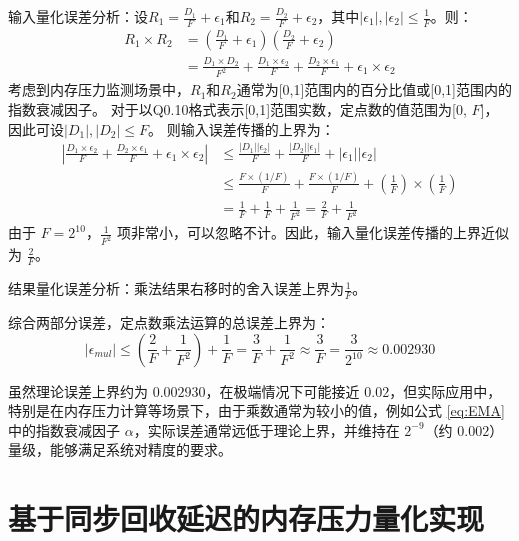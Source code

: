 输入量化误差分析：设$R_1 = \frac{D_1}{F} + \epsilon_1$和$R_2 = \frac{D_2}{F} + \epsilon_2$，其中$|\epsilon_1|, |\epsilon_2| \leq \frac{1}{F}$。则：
\[
\begin{aligned}
R_1 \times R_2 &= (\frac{D_1}{F} + \epsilon_1)(\frac{D_2}{F} + \epsilon_2) \\
&= \frac{D_1 \times D_2}{F^2} + \frac{D_1 \times \epsilon_2}{F} + \frac{D_2 \times \epsilon_1}{F} + \epsilon_1 \times \epsilon_2
\end{aligned}
\]
考虑到内存压力监测场景中，$R_1$和$R_2$通常为[0,1]范围内的百分比值或[0,1]范围内的指数衰减因子。 对于以Q0.10格式表示[0,1]范围实数，定点数的值范围为[0, $F$]，因此可设$|D_1|, |D_2| \leq F$。 则输入误差传播的上界为：
\begin{equation}
\begin{aligned}
|\frac{D_1 \times \epsilon_2}{F} + \frac{D_2 \times \epsilon_1}{F} + \epsilon_1 \times \epsilon_2| &\leq \frac{|D_1| |\epsilon_2|}{F} + \frac{|D_2| |\epsilon_1|}{F} + |\epsilon_1| |\epsilon_2| \\
&\leq \frac{F \times (1/F)}{F} + \frac{F \times (1/F)}{F} + (\frac{1}{F}) \times (\frac{1}{F}) \\
&= \frac{1}{F} + \frac{1}{F} + \frac{1}{F^2} = \frac{2}{F} + \frac{1}{F^2}
\end{aligned}
\end{equation}
由于 $F = 2^{10}$，$\frac{1}{F^2}$ 项非常小，可以忽略不计。因此，输入量化误差传播的上界近似为 $\frac{2}{F}$。

结果量化误差分析：乘法结果右移时的舍入误差上界为$\frac{1}{F}$。

综合两部分误差，定点数乘法运算的总误差上界为：
\begin{equation}
|\epsilon_{mul}| \leq (\frac{2}{F} + \frac{1}{F^2}) + \frac{1}{F} = \frac{3}{F} + \frac{1}{F^2} \approx \frac{3}{F} = \frac{3}{2^{10}} \approx 0.002930
\end{equation}

虽然理论误差上界约为 $0.002930$，在极端情况下可能接近 $0.02$，但实际应用中，特别是在内存压力计算等场景下，由于乘数通常为较小的值，例如公式 \eqref{eq:EMA} 中的指数衰减因子 $\alpha$，实际误差通常远低于理论上界，并维持在 $2^{-9}$（约 $0.002$）量级，能够满足系统对精度的要求。


\section{基于同步回收延迟的内存压力量化实现}
\label{sec:基于同步回收延迟的内存压力量化实现}

